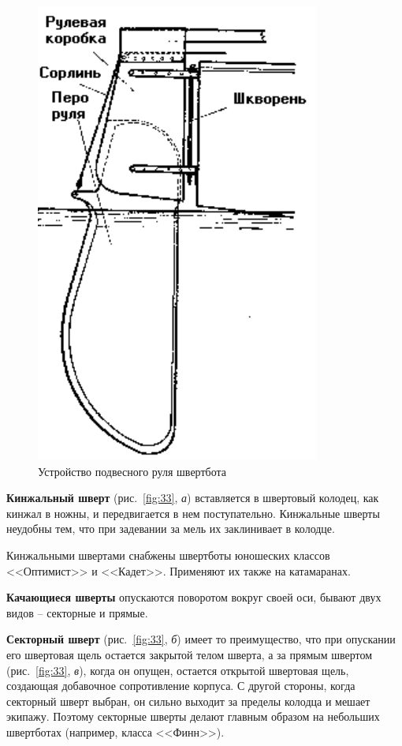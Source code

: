 \documentclass[a4paper, 12pt, twoside, final]{scrbook}
\begin{document}
\begin{figure}%
\begin{centering}
\includegraphics{Rul_shvertbota}
\par\end{centering}

\protect\caption{\label{fig:32}Устройство подвесного руля швертбота}


\end{figure}

\textbf{Кинжальный шверт} (рис.~\ref{fig:33},
\emph{а}) вставляется в швертовый колодец, как кинжал в ножны, и передвигается
в нем поступательно. Кинжальные шверты неудобны тем, что при задевании
за мель их заклинивает в колодце.

Кинжальными швертами снабжены швертботы юношеских классов <<Оптимист>>
и <<Кадет>>. Применяют их также на катамаранах.

\textbf{Качающиеся шверты} опускаются поворотом вокруг своей оси,
бывают двух видов \--- секторные и прямые.

\textbf{Секторный шверт} (рис.~\ref{fig:33},
\emph{б}) имеет то преимущество, что при опускании его швертовая щель
остается закрытой телом шверта, а за прямым швертом (рис.~\ref{fig:33},
\emph{в}), когда он опущен, остается открытой швертовая щель, создающая
добавочное сопротивление корпуса. С другой стороны, когда секторный
шверт выбран, он сильно выходит за пределы колодца и мешает экипажу.
Поэтому секторные шверты делают главным образом на небольших швертботах
(например, класса <<Финн>>). 
\end{document}
